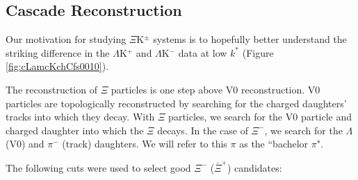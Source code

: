 \documentclass[../AnalysisNoteJBuxton.tex]{subfiles}
\begin{document}
\subsection{Cascade Reconstruction}
\label{CascadeReconstruction}

Our motivation for studying $\Xi$K$^{\pm}$ systems is to hopefully better understand the striking difference in the $\Lambda$K$^{+}$ and $\Lambda$K$^{-}$ data at low $k^{*}$ (Figure \ref{fig:cLamcKchCfs0010}).

The reconstruction of $\Xi$ particles is one step above V0 reconstruction.  V0 particles are topologically reconstructed by searching for the charged daughters' tracks into which they decay.  With $\Xi$ particles, we search for the V0 particle and charged daughter into which the $\Xi$ decays.  In the case of $\Xi^{-}$, we search for the $\Lambda$ (V0) and $\pi^{-}$ (track) daughters.  We will refer to this $\pi$ as the ``bachelor $\pi$".

The following cuts were used to select good $\Xi^{-}$ ($\bar{\Xi}^{+}$) candidates:
\end{document}
